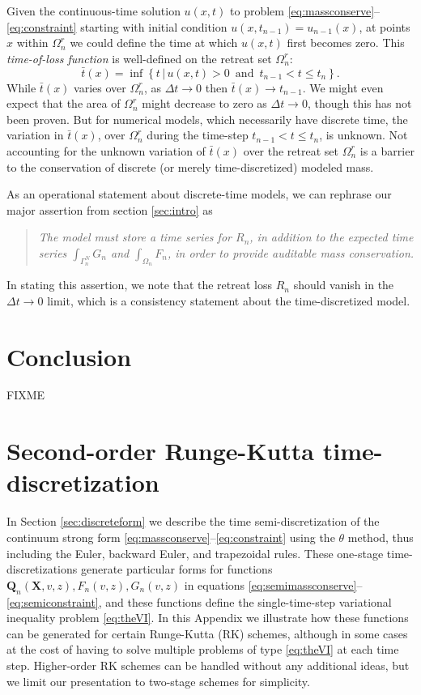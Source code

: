 \documentclass[final,leqno,onefignum,onetabnum]{siamltex1213bueler}
\newcommand\bQ{\mathbf{Q}}
\newcommand\bX{\mathbf{X}}
\begin{document}
Given the continuous-time solution $u(x,t)$ to problem \eqref{eq:massconserve}--\eqref{eq:constraint} starting with initial condition $u(x,t_{n-1}) = u_{n-1}(x)$, at points $x$ within $\Omega_n^r$ we could define the time at which $u(x,t)$ first becomes zero.  This \emph{time-of-loss function} is well-defined on the retreat set $\Omega_n^r$:
\begin{equation}
\bar t(x) = \inf\left\{t \,\big|\, u(x,t)>0 \,\text{ and }\, t_{n-1} < t \le t_n\right\}.
\end{equation}
While $\bar t(x)$ varies over $\Omega_n^r$, as $\Delta t \to 0$ then $\bar t(x) \to t_{n-1}$.  We might even expect that the area of $\Omega_n^r$ might decrease to zero as $\Delta t \to 0$, though this has not been proven.  But for numerical models, which necessarily have discrete time, the variation in $\bar t(x)$, over $\Omega_n^r$ during the time-step $t_{n-1} < t \le t_n$, is unknown.  Not accounting for the unknown variation of $\bar t(x)$ over the retreat set $\Omega_n^r$ is a barrier to the conservation of discrete (or merely time-discretized) modeled mass.

As an operational statement about discrete-time models, we can rephrase our major assertion from section \ref{sec:intro} as
\begin{quote}
\emph{The model must store a time series for $R_n$, in addition to the expected time series $\int_{\Gamma_n^N} G_n$ and $\int_{\Omega_n} F_n$, in order to provide auditable mass conservation.}
\end{quote}
In stating this assertion, we note that the retreat loss $R_n$ should vanish in the $\Delta t\to 0$ limit, which is a consistency statement about the time-discretized model.


\section{Conclusion} \label{sec:conclusion}  FIXME






\appendix

\section{Second-order Runge-Kutta time-discretization}   In Section \ref{sec:discreteform} we describe the time semi-discretization of the continuum strong form \eqref{eq:massconserve}--\eqref{eq:constraint} using the $\theta$ method, thus including the Euler, backward Euler, and trapezoidal rules.  These one-stage time-discretizations generate particular forms for functions $\bQ_n(\bX,v,z),F_n(v,z),G_n(v,z)$ in equations \eqref{eq:semimassconserve}--\eqref{eq:semiconstraint}, and these functions define the single-time-step variational inequality problem \eqref{eq:theVI}.  In this Appendix we illustrate how these functions can be generated for certain Runge-Kutta (RK) schemes, although in some cases at the cost of having to solve multiple problems of type \eqref{eq:theVI} at each time step.  Higher-order RK schemes can be handled without any additional ideas, but we limit our presentation to two-stage schemes for simplicity.
\end{document}
